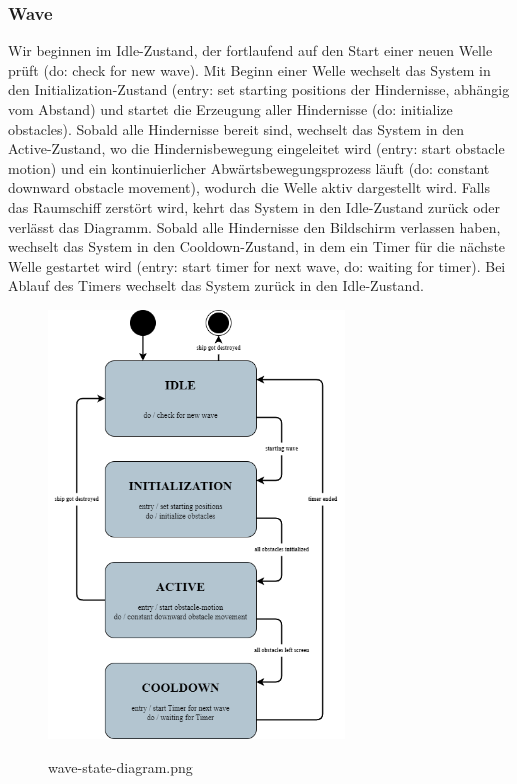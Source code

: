 \documentclass[10pt]{article}
\begin{document}
\subsubsection{Wave}
Wir beginnen im Idle-Zustand, der fortlaufend auf den Start einer neuen Welle prüft (do: check for new wave). Mit Beginn einer Welle wechselt das System in den Initialization-Zustand (entry: set starting positions der Hindernisse, abhängig vom Abstand) und startet die Erzeugung aller Hindernisse (do: initialize obstacles). Sobald alle Hindernisse bereit sind, wechselt das System in den Active-Zustand, wo die Hindernisbewegung eingeleitet wird (entry: start obstacle motion) und ein kontinuierlicher Abwärtsbewegungsprozess läuft (do: constant downward obstacle movement), wodurch die Welle aktiv dargestellt wird.
Falls das Raumschiff zerstört wird, kehrt das System in den Idle-Zustand zurück oder verlässt das Diagramm. Sobald alle Hindernisse den Bildschirm verlassen haben, wechselt das System in den Cooldown-Zustand, in dem ein Timer für die nächste Welle gestartet wird (entry: start timer for next wave, do: waiting for timer). Bei Ablauf des Timers wechselt das System zurück in den Idle-Zustand.
\begin{figure}
	\centering
	\includegraphics[width=0.7\textwidth]{../../../images/Pflichtenheft_Assets/uml-state-diagram/wave-state-diagram.png}\\
	\caption{wave-state-diagram.png}
\end{figure}
\end{document}
